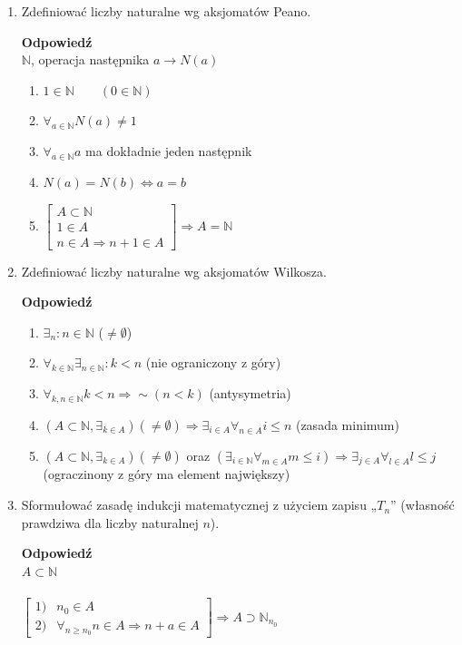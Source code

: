 \documentclass[12pt,a4paper]{article}
\theoremstyle{break}
\newcommand{\Odp}[1]{
		\begin{mdframed}[style=zadanie]
			\textbf{Odpowiedź}\\
			#1
		\end{mdframed}
	}
\begin{document}
\begin{enumerate}[1.]
	\item Zdefiniować liczby naturalne wg aksjomatów Peano.
	\Odp{
			$\mathbb{N}$, operacja następnika $a \rightarrow N(a)$
			\begin{enumerate}[1)]
				\item $1\in \mathbb{N} \qquad (0\in \mathbb{N})$
				\item $\forall_{a\in\mathbb{N}} N(a)\neq 1$
				\item $\forall_{a\in \mathbb{N}} a$ ma dokładnie jeden następnik
				\item $N(a)=N(b) \Leftrightarrow a=b$
				\item $\begin{bmatrix}
					A\subset \mathbb{N}\\
					1\in A\\
					n\in A \Rightarrow n+1\in A
				\end{bmatrix} \Rightarrow A=\mathbb{N}$
			\end{enumerate}
	}
	
	\item Zdefiniować liczby naturalne wg aksjomatów Wilkosza.
	\Odp{
	\begin{enumerate}[1)]
		\item $\exists_n : n\in\mathbb{N}$ ($\neq \emptyset$)
		\item $\forall_{k\in\mathbb{N}} \exists_{n\in\mathbb{N}}:k<n$ (nie ograniczony z góry)
		\item $\forall_{k,n\in \mathbb{N}} k<n \Rightarrow \sim (n<k)$ (antysymetria)
		\item $(A\subset\mathbb{N}, \exists_{k\in A})(\neq\emptyset) \Rightarrow \exists_{i\in A} \forall_{n\in A} i\leq n$ (zasada minimum)
		\item $(A\subset\mathbb{N}, \exists_{k\in A})(\neq\emptyset)$ oraz  $ (\exists_{i\in \mathbb{N}} \forall_{m\in A} m\leq i)\Rightarrow \exists_{j\in A} \forall_{l\in A} l\leq j$ (ograczinony z góry ma element największy)
	\end{enumerate}
	}
	\newpage
	\item Sformułować zasadę indukcji matematycznej z użyciem zapisu „$T_n$” (własność prawdziwa dla liczby naturalnej $n$).
	\Odp{
		$A\subset \mathbb{N}$\\\\
		
		$\begin{bmatrix}
			1) & n_0\in A\\
			2) & \forall_{n\geq n_0} n\in A \Rightarrow n+a\in A
		\end{bmatrix} \Rightarrow A \supset \mathbb{N}_{n_0}$\\\\
		
}
\end{enumerate}
\end{document}
